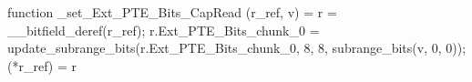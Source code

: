 function _set_Ext_PTE_Bits_CapRead (r_ref, v) = {
    r = __bitfield_deref(r_ref);
    r.Ext_PTE_Bits_chunk_0 = update_subrange_bits(r.Ext_PTE_Bits_chunk_0, 8, 8, subrange_bits(v, 0, 0));
    (*r_ref) = r
}
